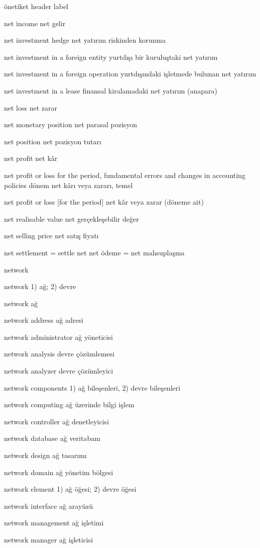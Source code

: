 \documentclass[12pt,fleqn]{article}\usepackage{../../common}
\begin{document}
önetiket header label

net income net gelir

net investment hedge net yatırım riskinden korunma

net investment in a foreign entity yurtdışı bir kuruluştaki net yatırım

net investment in a foreign operation yurtdışındaki işletmede bulunan net yatırım

net investment in a lease finansal kiralamadaki net yatırım (anapara)

net loss net zarar

net monetary position net parasal pozisyon

net position net pozisyon tutarı

net profit net kâr

net profit or loss for the period, fundamental errors and changes in accounting policies dönem net kârı veya zararı, temel

net profit or loss [for the period] net kâr veya zarar (döneme ait)

net realisable value net gerçekleşebilir değer

net selling price net satış fiyatı

net settlement = settle net net ödeme = net mahsuplaşma

network

network 1) ağ; 2) devre

network ağ

network address ağ adresi

network administrator ağ yöneticisi

network analysis devre çözümlemesi

network analyzer devre çözümleyici

network components 1) ağ bileşenleri, 2) devre bileşenleri

network computing ağ üzerinde bilgi işlem

network controller ağ denetleyicisi

network database ağ veritabanı

network design ağ tasarımı

network domain ağ yönetim bölgesi

network element 1) ağ öğesi; 2) devre öğesi

network interface ağ arayüzü

network management ağ işletimi

network manager ağ işleticisi
\end{document}
